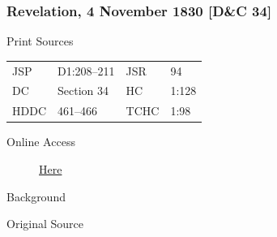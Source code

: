 		\subsubsection{Revelation, 4 November 1830 [D\&C 34]}
			\label{EMS-1830-JS-4-NOV-1830}
		
			\begin{description}
				\item[Print Sources]
			\end{description}

				\begin{tabular}{p{0.5in}p{1in}p{0.5in}p{1in}}
				JSP	 	& D1:208--211	& JSR 		& 94	 \\
				DC	 	& Section 34	& HC 		& 1:128 \\
				HDDC 	& 461--466		& TCHC 		& 1:98 \\
				\end{tabular}
			
			\begin{description}
				\item[Online Access] \href{https://www.josephsmithpapers.org/paper-summary/revelation-4-november-1830-dc-34/1}{Here}
			\end{description}
			
			\begin{description}
				\item[Background]
			\end{description}
			
			
			\begin{description}
				\item[Original Source]
			\end{description}
			
			
